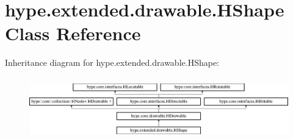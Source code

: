 \hypertarget{classhype_1_1extended_1_1drawable_1_1_h_shape}{\section{hype.\-extended.\-drawable.\-H\-Shape Class Reference}
\label{classhype_1_1extended_1_1drawable_1_1_h_shape}
}
Inheritance diagram for hype.\-extended.\-drawable.\-H\-Shape\-:\begin{figure}[H]
\begin{center}
\leavevmode
\includegraphics[height=2.745098cm]{classhype_1_1extended_1_1drawable_1_1_h_shape}
\end{center}
\end{figure}
